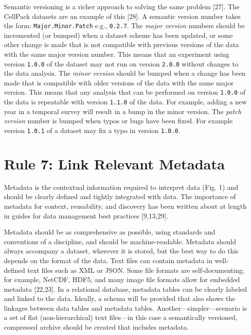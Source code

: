 \documentclass[10pt,letterpaper]{article}
\begin{document}
Semantic versioning is a richer approach to solving the same problem
{[}27{]}. The CellPack datasets are an example of this {[}28{]}. A
semantic version number takes the form: \texttt{Major.Minor.Patch} e.g.,
\texttt{0.2.7}. The \emph{major version} numbers should be incremented
(or bumped) when a dataset scheme has been updated, or some other change
is made that is not compatible with previous versions of the data with
the same major version number. This means that an experiment using
version \texttt{1.0.0} of the dataset may not run on version
\texttt{2.0.0} without changes to the data analysis. The \emph{minor
version} should be bumped when a change has been made that is compatible
with older versions of the data with the same major version. This means
that any analysis that can be performed on version \texttt{1.0.0} of the
data is repeatable with version \texttt{1.1.0} of the data. For example,
adding a new year in a temporal survey will result in a bump in the
minor version. The \emph{patch version} number is bumped when typos or
bugs have been fixed. For example version \texttt{1.0.1} of a dataset
may fix a typo in version \texttt{1.0.0}.

\section*{Rule 7: Link Relevant
Metadata}\label{rule-7-link-relevant-metadata}

Metadata is the contextual information required to interpret data (Fig.
1) and should be clearly defined and tightly integrated with data. The
importance of metadata for context, reusability, and discovery has been
written about at length in guides for data management best practices
{[}9,13,29{]}.

Metadata should be as comprehensive as possible, using standards and
conventions of a discipline, and should be machine-readable. Metadata
should always accompany a dataset, wherever it is stored, but the best
way to do this depends on the format of the data. Text files can contain
metadata in well-defined text files such as XML or JSON. Some file
formats are self-documenting; for example, NetCDF, HDF5, and many image
file formats allow for embedded metadata {[}22,23{]}. In a relational
database, metadata tables can be clearly labeled and linked to the data.
Ideally, a schema will be provided that also shows the linkages between
data tables and metadata tables. Another---simpler---scenario is a set
of flat (non-hierarchical) text files---in this case a semantically
versioned, compressed archive should be created that includes metadata.
\end{document}
